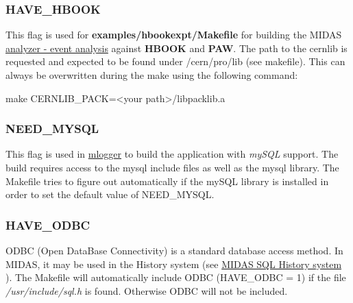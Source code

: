 \label{BuildingOptions_idx_HBOOK_build-flag}
\hypertarget{BuildingOptions_idx_HBOOK_build-flag}{}
 

 \hypertarget{BuildingOptions_BO_HAVE_HBOOK}{}\subsubsection{HAVE\_\-HBOOK}\label{BuildingOptions_BO_HAVE_HBOOK}
This flag is used for {\bfseries examples/hbookexpt/Makefile} for building the MIDAS \hyperlink{DataAnalysis_DA_analyzer_utility}{analyzer -\/ event analysis} against {\bfseries HBOOK} and {\bfseries PAW}. The path to the cernlib is requested and expected to be found under /cern/pro/lib (see makefile). This can always be overwritten during the make using the following command: 
\begin{DoxyCode}
make CERNLIB_PACK=<your path>/libpacklib.a
\end{DoxyCode}


\label{BuildingOptions_idx_mySQL_build-flag}
\hypertarget{BuildingOptions_idx_mySQL_build-flag}{}
 

\hypertarget{BuildingOptions_BO_NEED_MYSQL}{}\subsubsection{NEED\_\-MYSQL}\label{BuildingOptions_BO_NEED_MYSQL}
This flag is used in \hyperlink{F_Logging_F_mlogger_utility}{mlogger} to build the application with {\itshape mySQL\/} support. The build requires access to the mysql include files as well as the mysql library. The Makefile tries to figure out automatically if the mySQL library is installed in order to set the default value of NEED\_\-MYSQL.

\label{BuildingOptions_idx_ODBC}
\hypertarget{BuildingOptions_idx_ODBC}{}
 

\hypertarget{BuildingOptions_BO_HAVE_ODBC}{}\subsubsection{HAVE\_\-ODBC}\label{BuildingOptions_BO_HAVE_ODBC}
ODBC (Open DataBase Connectivity) is a standard database access method. In MIDAS, it may be used in the History system (see \hyperlink{F_History_logging_F_History_sql_internal}{MIDAS SQL History system} ). The Makefile will automatically include ODBC (HAVE\_\-ODBC = 1) if the file {\itshape  /usr/include/sql.h \/} is found. Otherwise ODBC will not be included.




